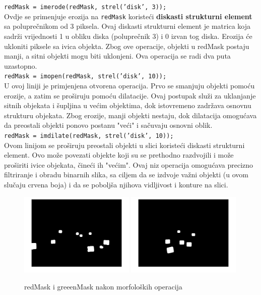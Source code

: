 \documentclass[a4paper,12pt]{article}
\begin{document}
\texttt{redMask = imerode(redMask, strel('disk', 3));}
\\

Ovdje se primenjuje erozija na \texttt{redMask} koristeći \textbf{diskasti strukturni element} sa poluprečnikom od 3 piksela. 
Ovaj diskasti strukturni element je matrica koja sadrži vrijednosti 1 u obliku diska (poluprečnik 3) i 0 izvan tog diska. 
Erozija će ukloniti piksele sa ivica objekta. 
Zbog ove operacije, objekti u redMask postaju manji, a sitni objekti mogu biti uklonjeni. Ova operacija se radi dva puta uzastopno.\\


\texttt{redMask = imopen(redMask, strel('disk', 10));}\\

U ovoj liniji je primjenjena otvorena operacija. Prvo se smanjuju objekti pomoću erozije, a zatim se proširuju pomoću dilatacije.  
Ovaj postupak služi za uklanjanje sitnih objekata i šupljina u većim objektima, dok istovremeno zadržava osnovnu strukturu objekata. 
Zbog erozije, manji objekti nestaju, dok dilatacija omogućava da preostali objekti ponovo postanu "veći" i sačuvaju osnovni oblik.\\


\texttt{redMask = imdilate(redMask, strel('disk', 10));}\\

Ovom linijom se proširuju preostali objekti u slici koristeći diskasti strukturni element. Ovo može povezati objekte koji su se prethodno razdvojili i može proširiti ivice objekata, čineći ih "većim".
Ovaj niz operacija omogućava precizno filtriranje i obradu binarnih slika, sa ciljem da se izdvoje važni objekti (u ovom slučaju crvena boja) i da se poboljša njihova vidljivost i konture na slici.


\begin{figure}[htbp]
    \centering
    \includegraphics[width=0.49\textwidth]{morphred.jpg}
    \hfill
    \includegraphics[width=0.49\textwidth]{morphgreen.jpg} 
    \caption{redMask i greeenMask nakon morfoloških operacija}
    \label{fig:redMaskgreenMask}
\end{figure}
\end{document}
